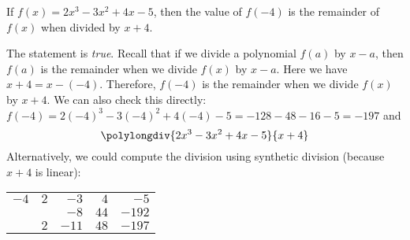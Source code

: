 \documentclass[11pt,letterpaper]{article}
\begin{document}
\newpage



 If $f(x)= 2x^3 - 3x^2 + 4x - 5$, then the value of $f(-4)$ is the remainder of $f(x)$ when divided by $x + 4$. \pspace

\sol The statement is \textit{true}. Recall that if we divide a polynomial $f(a)$ by $x - a$, then $f(a)$ is the remainder when we divide $f(x)$ by $x - a$. Here we have $x + 4= x - (-4)$. Therefore, $f(-4)$ is the remainder when we divide $f(x)$ by $x + 4$. We can also check this directly: $f(-4)= 2(-4)^3 - 3(-4)^2 + 4(-4) - 5= -128 - 48 - 16 - 5= -197$ and 
	\[
	\polylongdiv{2x^3 - 3x^2 + 4x - 5}{x + 4}
	\]
Alternatively, we could compute the division using synthetic division (because $x + 4$ is linear):
	\begin{table}[H]
	\centering
	\begin{tabular}{rrrrr}
	\multicolumn{1}{r|}{$-4$} & $2$ & $-3$ & $4$ & $-5$ \\ \cline{1-1}
		& 	  & $-8$ & $44$ & $-192$ \\ \hline
		& $2$ & $-11$ & $48$ & $-197$
	\end{tabular}
	\end{table} \pvspace{1cm}

\end{document}
